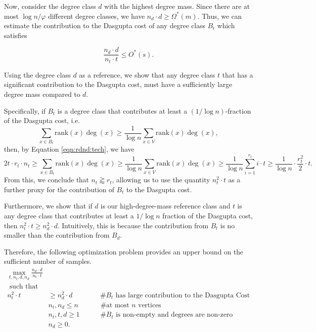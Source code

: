\documentclass[letterpaper,11pt]{article}
\newcommand{\rank}{\mathrm{rank}}
\theoremstyle{plain}
\theoremstyle{definition}
\theoremstyle{remark}
\begin{document}
Now, consider the degree class $d$ with the highest degree mass. Since there are at most $\log n/\varphi$ different degree classes,  we have $n_d \cdot d \geq \Omega^*(m).$
Thus, we can estimate the contribution to the Dasgupta cost of any degree class $B_t$  which satisfies 

\begin{equation*}\label{eq:doscoverclass}
 \frac{n_d \cdot d}{n_t \cdot t} \leq O^*(s). 
\end{equation*}

Using the degree class $d$ as a reference, we show that any degree class $t$ that has a significant contribution to the Dasgupta cost, must have a sufficiently large degree mass compared to $d$. 

Specifically, if $B_t$ is a degree class that contributes at least  a $(1/\log n)$-fraction of the Dasgupta cost, i.e. 
\[ \sum_{x \in B_t} \rank(x) \deg(x) \geq \frac{1}{\log n} \sum_{x \in V} \rank(x) \deg(x), \]
then, by Equation \eqref{eqn:rdnd:tech}, we have 
\[2t \cdot r_t \cdot n_t \geq \sum_{x \in B_t} \rank(x) \deg(x) \geq  \frac{1}{\log n} \sum_{x \in V} \rank(x) \deg(x) \geq  \frac{1}{\log n} \sum_{i=1}^{r_t} i \cdot t \geq  \frac{1}{\log n} \cdot \frac{r_t^2}{2} \cdot t.\]
From this, we conclude that $n_t \gtrapprox r_t$, allowing us to use the quantity $n_t ^2 \cdot t$ as a further proxy for the contribution of $B_t$ to the Dasgupta cost.  


Furthermore, we show that if $d$ is our high-degree-mass reference class and $t$ is any degree class that contributes at least a $1/\log n $ fraction of the Dasgupta cost, then $n_t^2 \cdot t \geq n_d^2 \cdot d$. Intuitively, this is because the contribution from $B_t$ is no smaller than the contribution from $B_d$. 

Therefore, the following optimization problem provides an upper bound on the sufficient number of samples. 
\begin{align*}
      \max_{t,n_t,d,n_d} \frac{n_d \cdot d}{n_t \cdot t}  & \quad  \\
      \text{ such that}&\\
       n_t^2 \cdot t & \geq  n_d^2\cdot  d \qquad \qquad \#\text{$B_t$  has large contribution to the Dasgupta Cost} \\
      &   n_t, n_d \leq n \qquad \quad \ \#\text{at most $n$ vertices} \\
    &   n_t,t, d \geq 1 \qquad \quad   \#\text{$B_t$ is non-empty and degrees are non-zero} \\
      &   n_d\geq 0 . 
\end{align*}
\end{document}
